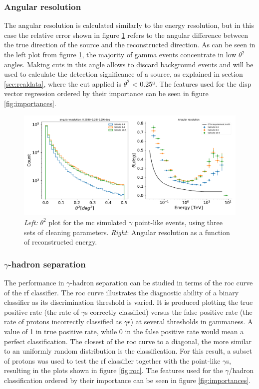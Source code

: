 \documentclass[main.tex]{subfiles}
\begin{document}
\subsubsection{Angular resolution}

The angular resolution is calculated similarly to the energy resolution, but in this case the relative error shown in figure \ref{fig:angres} refers to the angular difference between the true direction of the source and the reconstructed direction. As can be seen in the left plot from figure \ref{fig:angres}, the majority of gamma events concentrate in low $\theta^2$ angles. Making cuts in this angle allows to discard background events and will be used to calculate the detection significance of a source, as explained in section \ref{sec:realdata}, where the cut applied is $\theta^2$ < 0.25º. The features used for the disp vector regression ordered by their importance can be seen in figure \ref{fig:importances}.


\begin{figure}[h]
\centering
 \includegraphics[width=1\textwidth]{Pictures/angular_resolution.pdf}
  \caption{\textit{Left:} $\theta^2$ plot for the \gls{mc} simulated $\gamma$ point-like events, using three sets of cleaning parameters. \textit{Right}: Angular resolution as a function of reconstructed energy.}
    \label{fig:angres}
\end{figure}

\subsubsection{$\gamma$-hadron separation}

The performance in $\gamma$-hadron separation can be studied in terms of the \gls{roc} curve of the \gls{rf} classifier. The \gls{roc} curve illustrates the diagnostic ability of a binary classifier as its discrimination threshold is varied. It is produced plotting the true positive rate (the rate of $\gamma$s correctly classified) versus the false positive rate (the rate of protons incorrectly classified as $\gamma$s) at several thresholds in gammaness. A value of 1 in true positive rate, while 0 in the false positive rate would mean a perfect classification. The closest of the \gls{roc} curve to a diagonal, the more similar to an uniformly random distribution is the classification. For this result, a subset of protons was used to test the \gls{rf} classifier together with the point-like $\gamma$s, resulting in the plots shown in figure \ref{fig:roc}. The features used for the $\gamma$/hadron classification ordered by their importance can be seen in figure \ref{fig:importances}.
\end{document}
